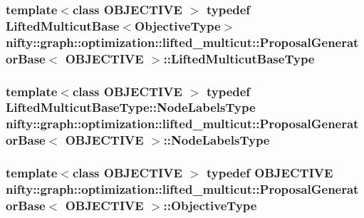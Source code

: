 \subsubsection[{Lifted\+Multicut\+Base\+Type}]{\setlength{\rightskip}{0pt plus 5cm}template$<$class O\+B\+J\+E\+C\+T\+I\+V\+E $>$ typedef {\bf Lifted\+Multicut\+Base}$<${\bf Objective\+Type}$>$ {\bf nifty\+::graph\+::optimization\+::lifted\+\_\+multicut\+::\+Proposal\+Generator\+Base}$<$ O\+B\+J\+E\+C\+T\+I\+V\+E $>$\+::{\bf Lifted\+Multicut\+Base\+Type}}\label{classnifty_1_1graph_1_1optimization_1_1lifted__multicut_1_1ProposalGeneratorBase_ac5b8a94509d7163a19e839f33f75a73e}
\hypertarget{classnifty_1_1graph_1_1optimization_1_1lifted__multicut_1_1ProposalGeneratorBase_a908a9320edb8af8735bc68481224b75e}{}
\subsubsection[{Node\+Labels\+Type}]{\setlength{\rightskip}{0pt plus 5cm}template$<$class O\+B\+J\+E\+C\+T\+I\+V\+E $>$ typedef {\bf Lifted\+Multicut\+Base\+Type\+::\+Node\+Labels\+Type} {\bf nifty\+::graph\+::optimization\+::lifted\+\_\+multicut\+::\+Proposal\+Generator\+Base}$<$ O\+B\+J\+E\+C\+T\+I\+V\+E $>$\+::{\bf Node\+Labels\+Type}}\label{classnifty_1_1graph_1_1optimization_1_1lifted__multicut_1_1ProposalGeneratorBase_a908a9320edb8af8735bc68481224b75e}
\hypertarget{classnifty_1_1graph_1_1optimization_1_1lifted__multicut_1_1ProposalGeneratorBase_a40e3d86c1e137e6745eaf17a3a500af0}{}
\subsubsection[{Objective\+Type}]{\setlength{\rightskip}{0pt plus 5cm}template$<$class O\+B\+J\+E\+C\+T\+I\+V\+E $>$ typedef O\+B\+J\+E\+C\+T\+I\+V\+E {\bf nifty\+::graph\+::optimization\+::lifted\+\_\+multicut\+::\+Proposal\+Generator\+Base}$<$ O\+B\+J\+E\+C\+T\+I\+V\+E $>$\+::{\bf Objective\+Type}}\label{classnifty_1_1graph_1_1optimization_1_1lifted__multicut_1_1ProposalGeneratorBase_a40e3d86c1e137e6745eaf17a3a500af0}


